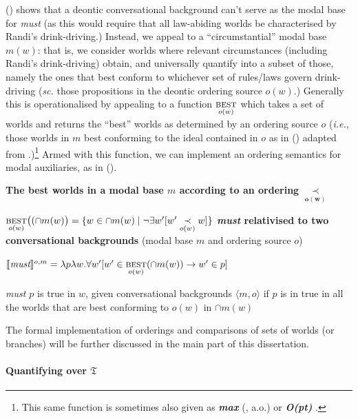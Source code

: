 \documentclass[11pt,dvipsnames]{report}
\providecommand{\denote}[2][]{\ensuremath{\llbracket{#2}\rrbracket^{#1}}}
\begin{document}
\noindent(\lastx) shows that a deontic conversational background can't serve as the modal base for \textit{must} (as this would require that all law-abiding worlds be characterised by Randi's drink-driving.) Instead, we appeal to a ``circumstantial'' modal base $ m(w) $: that is, we consider worlds where relevant circumstances (including Randi's drink-driving) obtain, and universally quantify into a subset of those, namely the ones that best conform to whichever set of rules/laws govern drink-driving (\textit{sc.} those propositions in the deontic ordering source $ o(w) $.) Generally this is operationalised by appealing to a function $ \underset{o(w)}{\textsc{best}}$ which takes a set of worlds and returns the ``best'' worlds as determined by an ordering source $ o $ (\textit{i.e.}, those worlds in $ m $ best conforming to the ideal contained in $ o $ as in (\nextx) adapted from \citealp[61]{VonFintel2011}.)\footnote{This same function is sometimes also given as \textbf{\textit{max}} (\citealp[\textit{e.g.},][]{Hacquard2006,VonFintel2008,VonFintel2011}, a.o.) or \textbf{\textit{O(pt)}} \citep[247]{Schwager2006}.} Armed with this function, we can implement an ordering semantics for modal auxiliaries, as in ().

\ex \textbf{The best worlds in a modal base $ m $ according to an ordering} $\boldsymbol{\underset{o(w)}{\prec}}$

$ \underset{o(w)}{\textsc{best}}\big((\cap m(w)\big)=\{w\in\cap m(w)\mid \neg\exists w'[w'\underset{o(w)}{\prec}w]\}$\label{ord-source}\xe
\pex \textbf{\textit{must} relativised to two conversational backgrounds} (modal base $ m $ and ordering source $ o $)

$\denote[o,m]{\textit{must}}=\lambda p\lambda w.\forall w'[w'\in\underset{o(w)}{\textsc{best}}(\cap m(w))\to w'\in p] $

\textit{must $ p $} is true in $ w $, given conversational backgrounds $ \langle{m,o}\rangle $ if $ p $ is in true in all the worlds that are best conforming to $ o(w) $ in $ \cap m(w) $
\xe





The formal implementation of orderings and comparisons of sets of worlds (or branches) will be further discussed in the main part of this dissertation.

\paragraph{Quantifying over $ \mathfrak{T} $}
\end{document}
